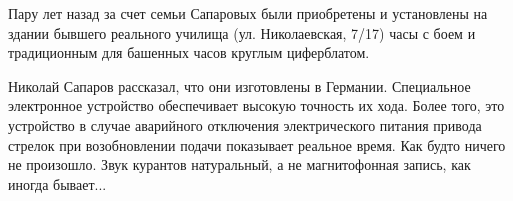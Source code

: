 Пару лет назад за счет семьи Сапаровых были приобретены и установлены на здании
бывшего реального училища (ул. Николаевская, 7/17) часы с боем и традиционным
для башенных часов круглым циферблатом.


Николай Сапаров рассказал, что они изготовлены в Германии. Специальное
электронное устройство обеспечивает высокую точность их хода. Более того, это
устройство в случае аварийного отключения электрического питания привода
стрелок при возобновлении подачи показывает реальное время. Как будто ничего не
произошло. Звук курантов натуральный, а не магнитофонная запись, как иногда
бывает...

